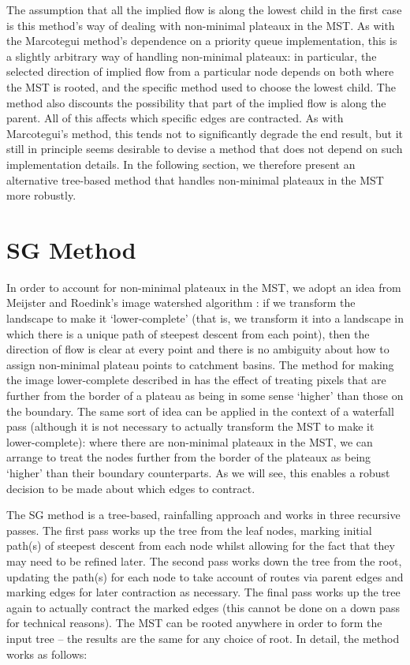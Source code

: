 \documentclass[review,a4paper]{elsarticle}
\begin{document}
The assumption that all the implied flow is along the lowest child in the first case is this method's way of dealing with non-minimal plateaux in the MST. As with the Marcotegui method's dependence on a priority queue implementation, this is a slightly arbitrary way of handling non-minimal plateaux: in particular, the selected direction of implied flow from a particular node depends on both where the MST is rooted, and the specific method used to choose the lowest child. The method also discounts the possibility that part of the implied flow is along the parent. All of this affects which specific edges are contracted. As with Marcotegui's method, this tends not to significantly degrade the end result, but it still in principle seems desirable to devise a method that does not depend on such implementation details. In the following section, we therefore present an alternative tree-based method that handles non-minimal plateaux in the MST more robustly.

\section{SG Method}
\label{sec:golodetz}

In order to account for non-minimal plateaux in the MST, we adopt an idea from Meijster and Roedink's image watershed algorithm \cite{meijster98}: if we transform the landscape to make it `lower-complete' (that is, we transform it into a landscape in which there is a unique path of steepest descent from each point), then the direction of flow is clear at every point and there is no ambiguity about how to assign non-minimal plateau points to catchment basins. The method for making the image lower-complete described in \cite{meijster98} has the effect of treating pixels that are further from the border of a plateau as being in some sense `higher' than those on the boundary. The same sort of idea can be applied in the context of a waterfall pass (although it is not necessary to actually transform the MST to make it lower-complete): where there are non-minimal plateaux in the MST, we can arrange to treat the nodes further from the border of the plateaux as being `higher' than their boundary counterparts. As we will see, this enables a robust decision to be made about which edges to contract.

The SG method is a tree-based, rainfalling approach and works in three recursive passes. The first pass works up the tree from the leaf nodes, marking initial path(s) of steepest descent from each node whilst allowing for the fact that they may need to be refined later. The second pass works down the tree from the root, updating the path(s) for each node to take account of routes via parent edges and marking edges for later contraction as necessary. The final pass works up the tree again to actually contract the marked edges (this cannot be done on a down pass for technical reasons). The MST can be rooted anywhere in order to form the input tree -- the results are the same for any choice of root. In detail, the method works as follows:
\end{document}
